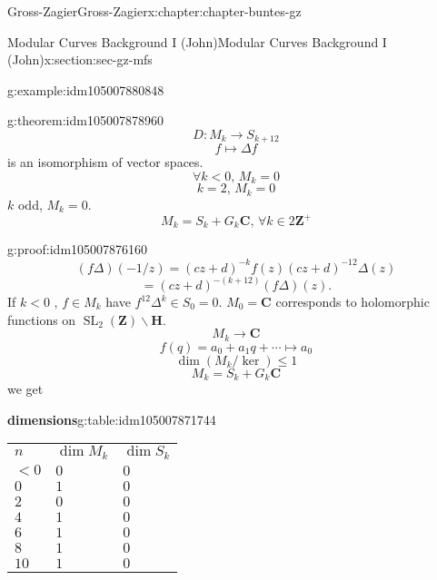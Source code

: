 \documentclass[oneside,10pt,]{book}
\newcommand{\tabularfont}{\relax}
\numberwithin{equation}{section}
\newcommand{\ZZ}{\mathbf{Z}}
\newcommand{\CC}{\mathbf{C}}
\newcommand{\HH}{\mathbf{H}}
\DeclareMathOperator{\SL}{SL}
\newcommand{\lt}{<}
\begin{document}
\begin{chapterptx}{Gross-Zagier}{}{Gross-Zagier}{}{}{x:chapter:chapter-buntes-gz}
\begin{sectionptx}{Modular Curves Background I (John)}{}{Modular Curves Background I (John)}{}{}{x:section:sec-gz-mfs}
\begin{example}{}{g:example:idm105007880848}
\end{example}
\begin{theorem}{}{}{g:theorem:idm105007878960}%
%
\begin{equation*}
D\colon M_k \to S_{k+12}
\end{equation*}
%
\begin{equation*}
f\mapsto \Delta f
\end{equation*}
is an isomorphism of vector spaces.%
\begin{equation*}
\forall k \lt  0,\, M_k = 0
\end{equation*}
%
\begin{equation*}
k=2,\, M_k = 0
\end{equation*}
\(k\) odd, \(M_k = 0\).%
\begin{equation*}
M_k = S_k + G_k \CC,\,\forall k \in 2\ZZ^+
\end{equation*}
%
\end{theorem}
\begin{proofptx}{}{g:proof:idm105007876160}
%
\begin{equation*}
(f\Delta) (-1/z) = (cz+d)^{-k}f(z) (cz+d)^{-12} \Delta (z)
\end{equation*}
%
\begin{equation*}
= (cz+d)^{-(k+12)}(f\Delta ) (z)\text{.}
\end{equation*}
If \(k \lt  0\) , \(f \in M_k\) have \(f^{12}\Delta ^k \in S_0 = 0\). \(M_0 =\CC\) corresponds to holomorphic functions on \(\SL_2(\ZZ) \backslash \HH\).%
\begin{equation*}
M_k \to \CC
\end{equation*}
%
\begin{equation*}
f(q) = a_0  + a_1 q + \cdots \mapsto a_0
\end{equation*}
%
\begin{equation*}
\dim(M_k / \ker) \le 1
\end{equation*}
%
\begin{equation*}
M_k = S_k + G_k \CC
\end{equation*}
we get%
\begin{tableptx}{\textbf{dimensions}}{g:table:idm105007871744}{}%
\centering
{\tabularfont%
\begin{tabular}{lll}
\(n\)&\(\dim M_k\)&\(\dim S_k\)\tabularnewline[0pt]
\(\lt 0\)&\(0\)&\(0\)\tabularnewline[0pt]
\(0\)&\(1\)&\(0\)\tabularnewline[0pt]
\(2\)&\(0\)&\(0\)\tabularnewline[0pt]
\(4\)&\(1\)&\(0\)\tabularnewline[0pt]
\(6\)&\(1\)&\(0\)\tabularnewline[0pt]
\(8\)&\(1\)&\(0\)\tabularnewline[0pt]
\(10\)&\(1\)&\(0\)\tabularnewline[0pt]

\end{tabular}}
\end{tableptx}
\end{proofptx}
\end{sectionptx}
\end{chapterptx}
\end{document}
